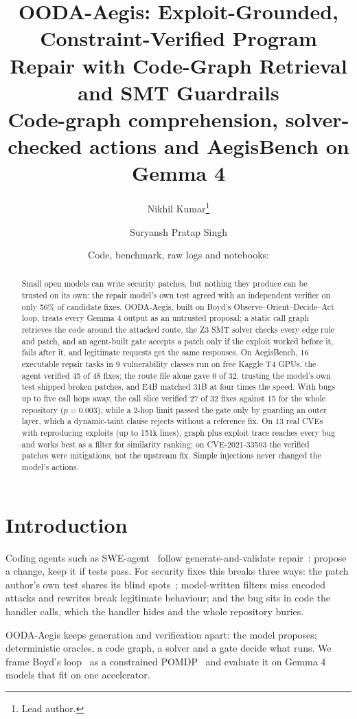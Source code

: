 \documentclass[10pt,a4paper]{article}
\title{\textbf{OODA-Aegis: Exploit-Grounded, Constraint-Verified Program Repair with Code-Graph Retrieval and SMT Guardrails}\\[0.8ex]
\large Code-graph comprehension, solver-checked actions and AegisBench on Gemma 4}
\author{Nikhil Kumar\thanks{Lead author.} \and Suryansh Pratap Singh}
\date{\small Code, benchmark, raw logs and notebooks: \repolink{}}
\begin{document}
\maketitle

\begin{abstract}
\noindent Small open models can write security patches, but nothing they produce can be trusted on its own: the repair model's own test agreed with an independent verifier on only 56\% of candidate fixes. OODA-Aegis, built on Boyd's Observe--Orient--Decide--Act loop, treats every Gemma 4 output as an untrusted proposal: a static call graph retrieves the code around the attacked route, the Z3 SMT solver checks every edge rule and patch, and an agent-built gate accepts a patch only if the exploit worked before it, fails after it, and legitimate requests get the same responses. On AegisBench, 16 executable repair tasks in 9 vulnerability classes run on free Kaggle T4 GPUs, the agent verified 45 of 48 fixes; the route file alone gave 0 of 32, trusting the model's own test shipped broken patches, and E4B matched 31B at four times the speed. With bugs up to five call hops away, the call slice verified 27 of 32 fixes against 15 for the whole repository ($p = 0.003$), while a 2-hop limit passed the gate only by guarding an outer layer, which a dynamic-taint clause rejects without a reference fix. On 13 real CVEs with reproducing exploits (up to 151k lines), graph plus exploit trace reaches every bug and works best as a filter for similarity ranking; on CVE-2021-33503 the verified patches were mitigations, not the upstream fix. Simple injections never changed the model's actions.
\end{abstract}

\section{Introduction}

Coding agents such as SWE-agent~\cite{sweagent} follow generate-and-validate repair~\cite{genprog,monperrus}: propose a change, keep it if tests pass. For security fixes this breaks three ways: the patch author's own test shares its blind spots~\cite{overfit}; model-written filters miss encoded attacks and rewrites break legitimate behaviour; and the bug sits in code the handler calls, which the handler hides and the whole repository buries.

OODA-Aegis keeps generation and verification apart: the model proposes; deterministic oracles, a code graph, a solver and a gate decide what runs. We frame Boyd's loop~\cite{boyd} as a constrained POMDP~\cite{altman} and evaluate it on Gemma 4 models that fit on one accelerator.
\end{document}
